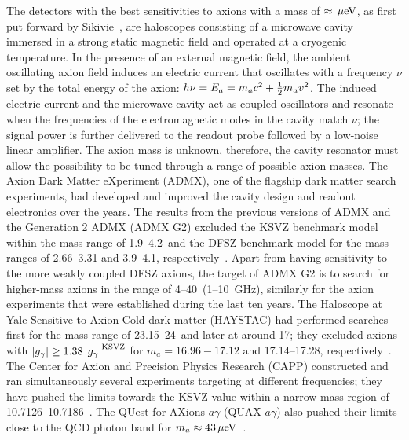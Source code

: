 The detectors with the best sensitivities to axions with a mass of 
$\approx \,\mu\text{e\hspace{-.08em}V}$, as first put forward by 
Sikivie~\cite{SikivieI,SikivieII},  
are haloscopes consisting of a microwave cavity immersed in a strong static 
magnetic field and operated at a cryogenic temperature. 
In the presence of an external magnetic field, the ambient 
oscillating axion field induces an electric current that oscillates with 
a frequency $\nu$ set by the total energy of the axion: 
$h\nu=E_a=m_a c^2 + \frac{1}{2}m_a v^2$. The induced electric current 
and the microwave cavity act as coupled oscillators and resonate when the 
frequencies of the electromagnetic modes in the cavity match $\nu$; the signal 
power is further delivered %
to the readout probe followed by a low-noise linear amplifier. 
The axion mass is unknown, therefore, 
the cavity resonator must allow the possibility to be tuned through a range
of possible axion masses. The Axion Dark Matter eXperiment (ADMX), 
one of the flagship dark matter search experiments, had developed and 
improved the cavity design and readout electronics over the years. 
The results from the previous 
versions of ADMX and the Generation 2 ADMX (ADMX G2) excluded the KSVZ 
benchmark model within the mass range of %
1.9--4.2\muevcc\ and the DFSZ benchmark model for the mass ranges 
of 2.66--3.31 and 3.9--4.1\muevcc, 
respectively~\cite{ADMXI,ADMXII,ADMXIII,ADMXIV,ADMXV,ADMXVI,ADMXVII}. 
Apart from having sensitivity to the more weakly coupled DFSZ axions, 
the target of ADMX G2 is to search for higher-mass axions in the range 
of 4--40\muevcc\ (1--10~GHz), similarly for the axion experiments that 
were established during the last ten years.  
The Haloscope at Yale Sensitive to Axion Cold dark matter 
(HAYSTAC) had performed searches first for the mass range of 
23.15--24\muevcc\ and later at around 17\muevcc; they excluded axions 
with $\left|g_{\gamma}\right|\geq 1.38 \left|g_{\gamma}\right|^\text{KSVZ}$ for $m_a=16.96-17.12$ and 
17.14--17.28\muevcc, respectively~\cite{HAYSTACI}. The Center 
for Axion and Precision Physics Research (CAPP) constructed 
and ran simultaneously several experiments targeting at 
different frequencies; they have pushed the limits towards the 
KSVZ value within a narrow mass region of 
10.7126--10.7186\muevcc~\cite{CAPPI}.
The QUest for AXions-$a\gamma$ (QUAX-$a\gamma$) also pushed their limits 
close to the QCD photon band for $m_a\approx43\,\mu\text{e\hspace{-.08em}V}$~\cite{QUAX}.   

